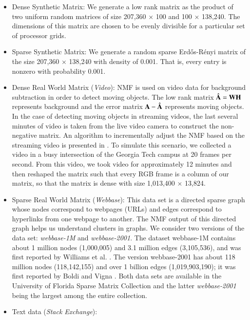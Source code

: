 \begin{itemize}
\item Dense Synthetic Matrix: We generate a low rank matrix as the product of two uniform random matrices of size 207,360 $\times$ 100 and 100 $\times$ 138,240. 
The dimensions of this matrix are chosen to be evenly divisible for a particular set of processor grids.  
\item Sparse Synthetic Matrix: We generate a random sparse Erd\H{o}s-R\'{e}nyi matrix of the size 207,360 $\times$ 138,240 with density of 0.001.  That is, every entry is nonzero with probability 0.001.
\item Dense Real World Matrix ({\em Video}):  NMF is used on video data for background subtraction in order to detect moving objects. The low rank matrix $\hat{\AA} = \WW \HH$ represents background and the error matrix $\AA - \hat{\AA}$ represents moving objects.  %
In the case of detecting moving objects in streaming videos, the last several minutes of video is taken from the live video camera to construct the non-negative matrix. 
An algorithm to incrementally adjust the NMF based on the streaming video is presented in \cite{kim2013nonnegative}. 
To simulate this scenario, we collected a video in a busy intersection of the Georgia Tech campus at 20 frames per second. 
From this video, we took video for approximately 12 minutes and  then reshaped the matrix such that every RGB frame is a column of our matrix, so that the matrix is dense with size 1,013,400 $\times$ 13,824. 
\item Sparse Real World Matrix ({\em Webbase}): This data set is a directed sparse graph whose nodes correspond to webpages (URLs) and edges correspond to hyperlinks from one webpage to another.
The NMF output of this directed graph helps us understand clusters in graphs.
We consider two versions of the data set: {\em webbase-1M} and {\em webbase-2001}.
The dataset webbase-1M contains about 1 million nodes (1,000,005) and 3.1 million edges (3,105,536), and was first reported by Williams et al. \cite{Williams2009}.  
The version webbase-2001 has about 118 million nodes (118,142,155) and over 1 billion edges (1,019,903,190); it was first reported by Boldi and Vigna  \cite{Boldi2004}.  
Both data sets are available in the University of Florida Sparse Matrix Collection \cite{DH11} and the latter {\em webbase-2001} being the largest among the entire collection.
\item Text data ({\em Stack Exchange}): 

\end{itemize}
